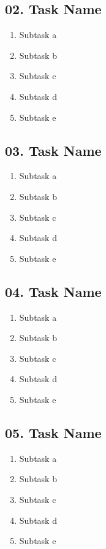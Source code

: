 \documentclass[12pt]{article}
\begin{document}
\subsection*{02. Task Name}
\begin{enumerate}[label=\alph*.]
    \item Subtask a
    \item Subtask b
    \item Subtask c
    \item Subtask d
    \item Subtask e
\end{enumerate}

\subsection*{03. Task Name}
\begin{enumerate}[label=\alph*.]
    \item Subtask a
    \item Subtask b
    \item Subtask c
    \item Subtask d
    \item Subtask e
\end{enumerate}

\subsection*{04. Task Name}
\begin{enumerate}[label=\alph*.]
    \item Subtask a
    \item Subtask b
    \item Subtask c
    \item Subtask d
    \item Subtask e
\end{enumerate}

\subsection*{05. Task Name}
\begin{enumerate}[label=\alph*.]
    \item Subtask a
    \item Subtask b
    \item Subtask c
    \item Subtask d
    \item Subtask e
\end{enumerate}
\end{document}
